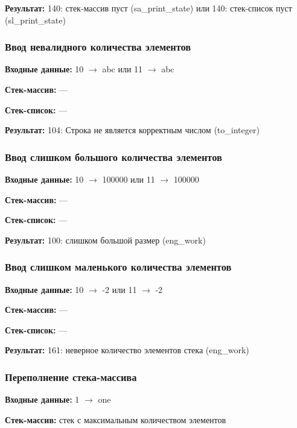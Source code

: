 \documentclass[a4paper,12pt]{extarticle}
\begin{document}
\textbf{Результат: }
140: стек-массив пуст (sa\_print\_state) или 140: стек-список пуст (sl\_print\_state)


\subsubsection{Ввод невалидного количества элементов}

\textbf{Входные данные: }
10 $\rightarrow$ abc или 11 $\rightarrow$ abc

\textbf{Стек-массив: }
---

\textbf{Стек-список: }
---

\textbf{Результат: }
104: Строка не является корректным числом (to\_integer)


\subsubsection{Ввод слишком большого количества элементов}

\textbf{Входные данные: }
10 $\rightarrow$ 100000 или 11 $\rightarrow$ 100000

\textbf{Стек-массив: }
---

\textbf{Стек-список: }
---

\textbf{Результат: }
100: слишком большой размер (eng\_work)


\subsubsection{Ввод слишком маленького количества элементов}

\textbf{Входные данные: }
10 $\rightarrow$ -2 или 11 $\rightarrow$ -2

\textbf{Стек-массив: }
---

\textbf{Стек-список: }
---

\textbf{Результат: }
161: неверное количество элементов стека (eng\_work)


\subsubsection{Переполнение стека-массива}

\textbf{Входные данные: }
1 $\rightarrow$ one

\textbf{Стек-массив: }
стек с максимальным количеством элементов
\end{document}
